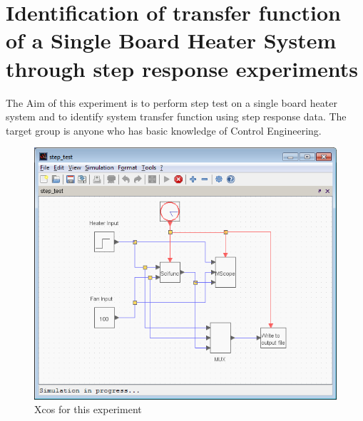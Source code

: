 \chapter{Identification of transfer function of a Single Board Heater System through step response experiments}\label{chap1}
The Aim of this experiment is to perform step test on a single board heater system and to identify system transfer function using step response data. The target group is anyone who has basic knowledge of Control Engineering.
\begin{figure}
\centering
\includegraphics[width=\linewidth]{Step-test_manual/step.png}
\caption{Xcos for this experiment}
\label{xcos_st}
\end{figure}

